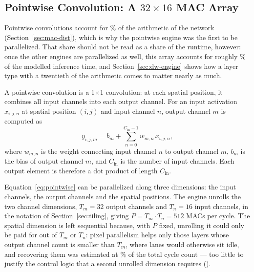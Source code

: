 \subsection{Pointwise Convolution: A \texorpdfstring{$32 \times 16$}{32x16} MAC Array}
\label{sec:pw-array}

Pointwise convolutions account for \thPwMacPct\% of the arithmetic of the
network (Section~\ref{sec:mac-dist}), which is why the pointwise engine was the
first to be parallelized. That share should not be read as a share of the
runtime, however: once the other engines are parallelized as well, this array
accounts for roughly \thPwRuntimePct\% of the modelled inference time, and
Section~\ref{sec:dw-engine} shows how a layer type with a twentieth of the
arithmetic comes to matter nearly as much.

A pointwise convolution is a 1$\times$1 convolution: at each spatial position,
it combines all input channels into each output channel. For an input
activation $x_{i,j,n}$ at spatial position $(i,j)$ and input channel $n$,
output channel $m$ is computed as
\begin{equation}
  y_{i,j,m} = b_m + \sum_{n=0}^{C_{\mathrm{in}}-1} w_{m,n}\, x_{i,j,n},
  \label{eq:pointwise}
\end{equation}
where $w_{m,n}$ is the weight connecting input channel $n$ to output
channel $m$, $b_m$ is the bias of output channel $m$, and $C_{\mathrm{in}}$ is
the number of input channels. Each output element is therefore a dot product
of length $C_{\mathrm{in}}$.

Equation~\eqref{eq:pointwise} can be parallelized along three dimensions: the
input channels, the output channels and the spatial positions. The engine
unrolls the two channel dimensions, $T_m = 32$ output channels and $T_n = 16$
input channels, in the notation of Section~\ref{sec:tiling}, giving
$P = T_m \cdot T_n = 512$ MACs per cycle. The spatial dimension is left
sequential because, with $P$ fixed, unrolling it could only be paid for out of
$T_m$ or $T_n$: pixel parallelism helps only those layers whose output channel
count is smaller than $T_m$, where lanes would otherwise sit idle, and
recovering them was estimated at \thPwPixelGain\% of the total cycle count ---
too little to justify the control logic that a second unrolled dimension
requires ().

